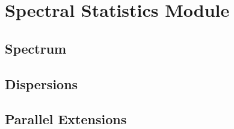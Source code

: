 \newpage

\section{Spectral Statistics Module}

\subsection{Spectrum}

\subsection{Dispersions}

\subsection{Parallel Extensions}


%

